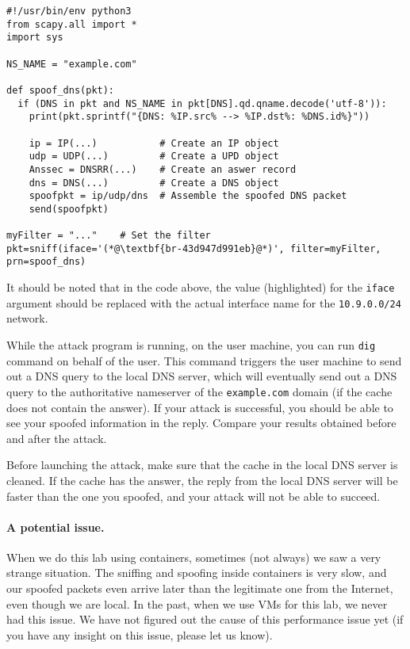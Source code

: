 \begin{lstlisting}
#!/usr/bin/env python3
from scapy.all import *
import sys

NS_NAME = "example.com"

def spoof_dns(pkt):
  if (DNS in pkt and NS_NAME in pkt[DNS].qd.qname.decode('utf-8')):
    print(pkt.sprintf("{DNS: %IP.src% --> %IP.dst%: %DNS.id%}"))

    ip = IP(...)           # Create an IP object
    udp = UDP(...)         # Create a UPD object
    Anssec = DNSRR(...)    # Create an aswer record
    dns = DNS(...)         # Create a DNS object
    spoofpkt = ip/udp/dns  # Assemble the spoofed DNS packet
    send(spoofpkt)

myFilter = "..."    # Set the filter
pkt=sniff(iface='(*@\textbf{br-43d947d991eb}@*)', filter=myFilter, prn=spoof_dns)
\end{lstlisting}

It should be noted that in the code above, the value (highlighted) for the 
\texttt{iface} argument should be replaced with the actual interface 
name for the \texttt{10.9.0.0/24} network.  
 
While the attack program is running, on the user machine, you can
run \texttt{dig} command on behalf of the user.
This command triggers the user
machine to send out a DNS query to the local DNS server, which will
eventually send out a DNS query to the authoritative nameserver of the
\texttt{example.com} domain (if the cache does not contain the answer).
If your attack is successful, you should be able to see
your spoofed information in the reply. Compare your results obtained before
and after the attack. 

Before launching the attack, make sure that the cache in the local DNS
server is cleaned. If the cache has the answer, the reply from the 
local DNS server will be faster than the one you spoofed, and your 
attack will not be able to succeed. 





\paragraph{A potential issue.} When we do this lab using containers, 
sometimes (not always) we saw a very strange situation. The sniffing and spoofing 
inside containers is very slow, and our spoofed packets even arrive 
later than the legitimate one from the Internet, even though 
we are local. In the past, when we use VMs for this lab, we never 
had this issue. We have not figured out the cause of this 
performance issue yet (if you have any insight on this issue, please 
let us know). 

